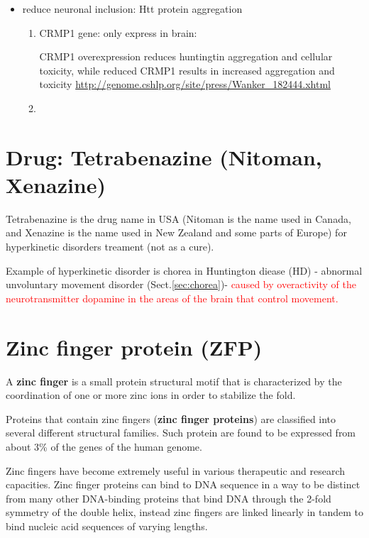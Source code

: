 \begin{itemize}
\begin{enumerate}
  \end{enumerate}
  
  \item reduce neuronal inclusion: Htt protein aggregation
  \begin{enumerate}
      \item CRMP1 gene: only express in brain:
  
  CRMP1 overexpression reduces huntingtin aggregation and cellular toxicity,
  while reduced CRMP1 results in increased aggregation and toxicity
  \url{http://genome.cshlp.org/site/press/Wanker_182444.xhtml}
  
      \item 
  \end{enumerate}   
\end{itemize}

\section{Drug: Tetrabenazine (Nitoman, Xenazine)}

Tetrabenazine is the drug name in USA (Nitoman is the name used in Canada, and
Xenazine is the name used in New Zealand and some parts of Europe) for
hyperkinetic disorders treament (not as a cure). 

Example of hyperkinetic disorder is chorea in Huntington diease (HD) - abnormal
unvoluntary movement disorder (Sect.\ref{sec:chorea})- \textcolor{red}{caused by
overactivity of the neurotransmitter dopamine in the areas of the brain that
control movement.}



\section{Zinc finger protein (ZFP)}
\label{sec:ZFP}

A {\bf zinc finger} is a small protein structural motif that is characterized by
the coordination of one or more zinc ions in order to stabilize the fold. 

Proteins that contain zinc fingers ({\bf zinc finger proteins}) are classified
into several different structural families. 
Such protein are found to be expressed from about 3\% of the genes of the human
genome.

Zinc fingers have become extremely useful in various therapeutic and research
capacities. Zinc finger proteins can bind to DNA sequence in a way to be
distinct from many other DNA-binding proteins that bind DNA through the 2-fold
symmetry of the double helix, instead zinc fingers are linked linearly in tandem
to bind nucleic acid sequences of varying lengths.

